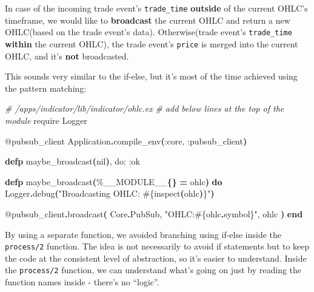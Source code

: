 \documentclass[
  oneside]{book}
\newenvironment{Shaded}{\begin{snugshade}}{\end{snugshade}}
\newcommand{\CommentTok}[1]{\textcolor[rgb]{0.56,0.35,0.01}{\textit{#1}}}
\newcommand{\ConstantTok}[1]{\textcolor[rgb]{0.56,0.35,0.01}{#1}}
\newcommand{\FunctionTok}[1]{\textcolor[rgb]{0.13,0.29,0.53}{\textbf{#1}}}
\newcommand{\ImportTok}[1]{#1}
\newcommand{\KeywordTok}[1]{\textcolor[rgb]{0.13,0.29,0.53}{\textbf{#1}}}
\newcommand{\NormalTok}[1]{#1}
\newcommand{\OperatorTok}[1]{\textcolor[rgb]{0.81,0.36,0.00}{\textbf{#1}}}
\newcommand{\OtherTok}[1]{\textcolor[rgb]{0.56,0.35,0.01}{#1}}
\newcommand{\StringTok}[1]{\textcolor[rgb]{0.31,0.60,0.02}{#1}}
\newcommand{\VariableTok}[1]{\textcolor[rgb]{0.00,0.00,0.00}{#1}}
\begin{document}
In case of the incoming trade event's \texttt{trade\_time} \textbf{outside} of the current OHLC's timeframe, we would like to \textbf{broadcast} the current OHLC and return a new OHLC(based on the trade event's data). Otherwise(trade event's \texttt{trade\_time} \textbf{within} the current OHLC), the trade event's \texttt{price} is merged into the current OHLC, and it's \textbf{not} broadcasted.

This sounds very similar to the if-else, but it's most of the time achieved using the pattern matching:

\begin{Shaded}
\begin{Highlighting}[]
\CommentTok{\# /apps/indicator/lib/indicator/ohlc.ex}
 \CommentTok{\# add below lines at the top of the module}
 \ImportTok{require} \ConstantTok{Logger}

 \OtherTok{@pubsub\_client} \ConstantTok{Application}\OperatorTok{.}\NormalTok{compile\_env}\FunctionTok{(}\VariableTok{:core}\NormalTok{, }\VariableTok{:pubsub\_client}\FunctionTok{)}

  \KeywordTok{defp}\NormalTok{ maybe\_broadcast}\FunctionTok{(}\ConstantTok{nil}\FunctionTok{)}\NormalTok{, }\VariableTok{do:} \VariableTok{:ok}

  \KeywordTok{defp}\NormalTok{ maybe\_broadcast}\FunctionTok{(}\NormalTok{\%}\ConstantTok{\_\_MODULE\_\_}\FunctionTok{\{\}} \OperatorTok{=}\NormalTok{ ohlc}\FunctionTok{)} \KeywordTok{do}
    \ConstantTok{Logger}\OperatorTok{.}\NormalTok{debug}\FunctionTok{(}\StringTok{"Broadcasting OHLC: }\OtherTok{\#\{}\NormalTok{inspect}\FunctionTok{(}\NormalTok{ohlc}\FunctionTok{)}\OtherTok{\}}\StringTok{"}\FunctionTok{)}

    \OtherTok{@pubsub\_client}\OperatorTok{.}\NormalTok{broadcast}\FunctionTok{(}
      \ConstantTok{Core}\OperatorTok{.}\ConstantTok{PubSub}\NormalTok{,}
      \StringTok{"OHLC:}\OtherTok{\#\{}\NormalTok{ohlc}\OperatorTok{.}\NormalTok{symbol}\OtherTok{\}}\StringTok{"}\NormalTok{,}
\NormalTok{      ohlc}
    \FunctionTok{)}
  \KeywordTok{end}
\end{Highlighting}
\end{Shaded}

By using a separate function, we avoided branching using if-else inside the \texttt{process/2} function. The idea is not necessarily to avoid if statements but to keep the code at the consistent level of abstraction, so it's easier to understand. Inside the \texttt{process/2} function, we can understand what's going on just by reading the function names inside - there's no ``logic''.
\end{document}
